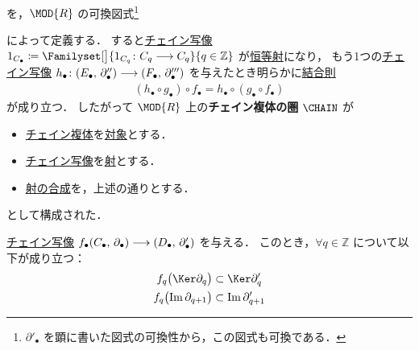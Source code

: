 \documentclass[algtopo_main]{subfiles}
\begin{document}
を，$\MOD{R}$ の可換図式\footnote{$\partial'_\bullet$ を顕に書いた図式の可換性から，この図式も可換である．}
\begin{center}
\end{center}
によって定義する．
すると\hyperref[def:chainmap]{チェイン写像} $1_{C_\bullet} \coloneqq \Familyset[\big]{1_{C_q} \colon C_q \lto C_q}{q \in \mathbb{Z}}$ が\hyperref[def:category]{恒等射}になり，
もう1つの\hyperref[def:chainmap]{チェイン写像} $h_\bullet \colon(E_\bullet,\, \partial''_\bullet) \longrightarrow (F_\bullet,\, \partial'''_\bullet)$ を与えたとき明らかに\hyperref[def:category]{結合則}
\begin{align}
    (h_\bullet \circ g_\bullet) \circ f_\bullet = h_\bullet \circ (g_\bullet \circ f_\bullet)
\end{align}
が成り立つ．
したがって $\MOD{R}$ 上の\textbf{チェイン複体の圏} $\CHAIN$ が
\begin{itemize}
    \item \hyperref[def:CC]{チェイン複体}を\hyperref[def:category]{対象}とする．
    \item \hyperref[def:chainmap]{チェイン写像}を\hyperref[def:category]{射}とする．
    \item \hyperref[def:category]{射の合成}を，上述の通りとする．
\end{itemize}
として構成された．



\begin{mylem}[label=lem:chain1]{}
    \hyperref[def:chainmap]{チェイン写像} $f_\bullet (C_\bullet,\, \partial_\bullet) \longrightarrow (D_\bullet,\, \partial'_\bullet)$ を与える．
    このとき，$\forall q \in \mathbb{Z}$ について以下が成り立つ：
    \begin{align}
        f_q \bigl( \Ker \partial_q \bigr) &\subset \Ker \partial'_q \\
        f_q \bigl( \Im \partial_{q+1} \bigr) &\subset \Im \partial'_{q+1}
    \end{align}
\end{mylem}
\end{document}
